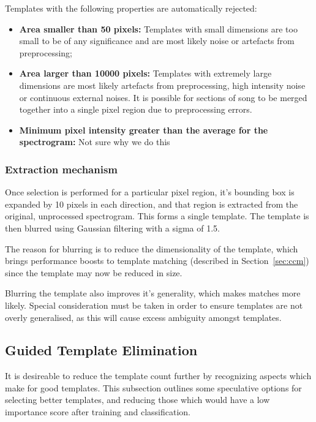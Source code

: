 Templates with the following properties are automatically rejected:
\begin{itemize}[noitemsep]
  \item \textbf{Area smaller than 50 pixels:} Templates with small dimensions
    are too small to be of any significance and are most likely noise or
    artefacts from preprocessing;

  \item \textbf{Area larger than 10000 pixels:} Templates with extremely large
    dimensions are most likely artefacts from preprocessing, high intensity
    noise or continuous external noises.
    It is possible for sections of song to be merged together into a single
    pixel region due to preprocessing errors.

  \item \textbf{Minimum pixel intensity greater than the average for the
    spectrogram:} Not sure why we do this
\end{itemize}


\subsubsection{Extraction mechanism}\label{sec:extract}
Once selection is performed for a particular pixel region, it's bounding box is
expanded by 10 pixels in each direction, and that region is extracted from the
original, unprocessed spectrogram.
This forms a single template.
The template is then blurred using Gaussian filtering with a sigma of 1.5.

The reason for blurring is to reduce the dimensionality of the template, which
brings performance boosts to template matching (described in
Section~\ref{sec:ccm}) since the template may now be reduced in size.

Blurring the template also improves it's generality, which makes matches more
likely.
Special consideration must be taken in order to ensure templates are not overly
generalised, as this will cause excess ambiguity amongst templates.



\subsection{Guided Template Elimination}
It is desireable to reduce the template count further by recognizing aspects which
make for good templates. This subsection outlines some speculative options for
selecting better templates, and reducing those which would have a low importance
score after training and classification.


